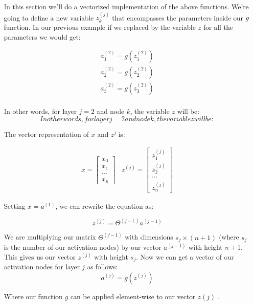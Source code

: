 \documentclass[10pt,a4paper,UTF8]{article}
\begin{document}
In this section we'll do a vectorized implementation of the above functions. We're going to define a new variable \(z_{k}^{(j)}\) that encompasses the parameters inside our \(g\) function. In our previous example if we replaced by the variable \(z\) for all the parameters we would get:

\begin{align*}a_1^{(2)} = g(z_1^{(2)}) \\ a_2^{(2)} = g(z_2^{(2)}) \\ a_3^{(2)} = g(z_3^{(2)}) \\ \end{align*}

In other words, for layer \(j=2\) and node \(k\), the variable \(z\) will be:
\begin{equation}
\label{eq:3}
In other words, for layer j=2 and node k, the variable z will be:
\end{equation}

The vector representation of \(x\) and \(z^{j}\) is:


\begin{align*}x = \begin{bmatrix}x_0 \\ x_1 \\\cdots \\ x_n\end{bmatrix} &z^{(j)} = \begin{bmatrix}z_1^{(j)} \\ z_2^{(j)} \\\cdots \\ z_n^{(j)}\end{bmatrix}\end{align*}

Setting \(x=a^{(1)}\), we can rewrite the equation as:

\begin{equation}
\label{eq:4}
z^{(j)} = \Theta^{(j-1)}a^{(j-1)}
\end{equation}

We are multiplying our matrix \(\Theta^{(j-1)}\) with dimensions \(s_{j}\times(n+1)\) (where \(s_{j}\) is the number of our activation nodes) by our vector \(a^{(j-1)}\) with height \(n+1\). This gives us our vector \(z^{(j)}\) with height \(s_{j}\). Now we can get a vector of our activation nodes for layer \(j\) as follows:
\begin{equation}
\label{eq:5}
a^{(j)} = g(z^{(j)})
\end{equation}

Where our function \(g\) can be applied element-wise to our vector  \(z(j)\) .
\end{document}
